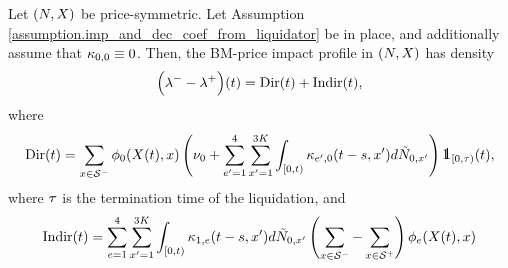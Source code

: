 \documentclass[10pt, article,table]{article}
\begin{document}
\begin{prop}\label{prop.bm_impact}
 Let $(N,X)$ be price-symmetric. Let Assumption \ref{assumption.imp_and_dec_coef_from_liquidator} be in place, and additionally assume that $\kappa_{0,0} \equiv 0$. Then, the BM-price impact profile in $(N,X)$ has density
 \begin{equation}\label{eq.intensity_of_BM-impact}
 \Big(\lambda_{}^{-} - \lambda_{}^{+}\Big)(t)
  =\text{Dir}(t) + \text{Indir}(t),
  \end{equation}
  where 
  \begin{equation*}
   \directImpact(t)=  
  \sum_{x\in\deflationarySpace}\transProb_{0} (\stateVariable(t),x)
  \left(\baseRate_{0}  
  + \sum_{\eone=1}^{4}\sum_{\xone=1}^{3K} \int_{[0,t)} \hawkesKernel_{\eone,0}(t-s,\xone)d\hybridHawkes_{0,\xone}
  \right)
  \one_{[0,\terminationTime)} (t),
  \end{equation*}
 where $\tau$ is the termination time of the liquidation, and
 \begin{equation*}
  \text{Indir}(t)=
  \sum_{e=1}^{4}\sum_{x^{\prime}=1}^{3K} \int_{[0,t)} \kappa_{1,e}(t-s,x^{\prime})d\tilde{N}_{0,x^{\prime}}
  \left(
  \sum_{x\in\mathcal{S}^{-}}
  -
  \sum_{x\in\mathcal{S}^{+}}
  \right) \phi_{e}(X(t),x)
 \end{equation*}
\end{prop}
\end{document}
